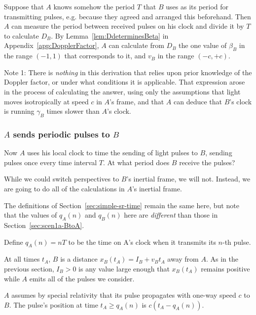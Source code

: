 \documentclass[a4paper]{article}
\theoremstyle{plain}
\theoremstyle{definition}
\begin{document}
Suppose that $A$ knows somehow the period $T$ that $B$ uses as its
period for transmitting pulses, e.g. because they agreed and arranged
this beforehand.  Then $A$ can measure the period between received
pulses on his clock and divide it by $T$ to calculate $D_B$.
By Lemma~\ref{lem:DdeterminesBeta} in
Appendix~\ref{app:DopplerFactor}, $A$ can calculate from $D_B$ the one
value of $\beta_B$ in the range $(-1, 1)$ that corresponds to it, and
$v_B$ in the range $(-c, +c)$.

Note 1: There is {\em nothing} in this derivation that relies upon prior
knowledge of the Doppler factor, or under what conditions it is
applicable.  That expression arose in
the process of calculating the answer, using only the assumptions that
light moves isotropically at speed $c$ in $A$'s frame, and that $A$
can deduce that $B$'s clock is running $\gamma_B$ times slower than
$A$'s clock.


\subsubsection{$A$ sends periodic pulses to $B$}
\label{sec:scen1a-AtoB}

Now $A$ uses his local clock to time the sending of light pulses to $B$,
sending pulses once every time interval $T$.
At what period does $B$ receive the pulses?

While we could switch perspectives to $B$'s inertial frame, we will
not.  Instead, we are going to do all of the calculations in $A$'s
inertial frame.

The definitions of Section~\ref{sec:simple-sr-time} remain the same here, but note
that the values of $q_A(n)$ and $q_B(n)$ here are {\em different} than
those in Section~\ref{sec:scen1a-BtoA}.

Define $q_A(n) = nT$ to be the time on A's clock when it transmits its
$n$-th pulse.

At all times $t_A$, $B$ is a distance $x_B(t_A) = I_B + v_B t_A$ away from $A$.
As in the previous section, $I_B > 0$ is any value large enough
that $x_B(t_A)$ remains positive while $A$ emits all of the pulses we consider.

$A$ assumes by special relativity that its pulse propagates with one-way
speed $c$ to $B$.  The pulse's position at time $t_A \geq q_A(n)$ is
$c(t_A - q_A(n))$.
\end{document}

